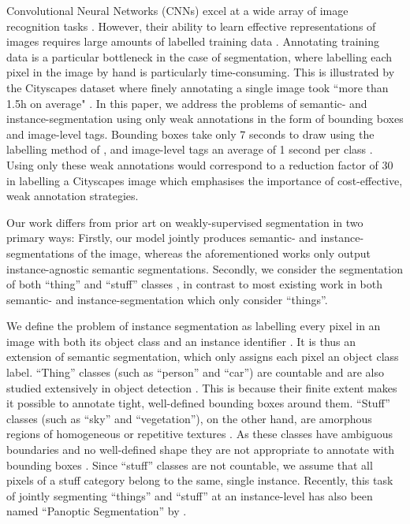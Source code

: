 \documentclass[runningheads]{llncs}
\begin{document}
Convolutional Neural Networks (CNNs) excel at a wide array of image recognition tasks \cite{he_cvpr_2016,simonyan_iclr_2015,ren_2015}.
However, their ability to learn effective representations of images requires large amounts of labelled training data \cite{russakovsky_ijcv_2015,sun_iccv_2017}.
Annotating training data is a particular bottleneck in the case of segmentation, where labelling each pixel in the image by hand is particularly time-consuming.
This is illustrated by the Cityscapes dataset where finely annotating a single image took ``more than 1.5h on average" \cite{cordts_cvpr_2016}.
In this paper, we address the problems of semantic- and instance-segmentation using only weak annotations in the form of bounding boxes and image-level tags.
Bounding boxes take only 7 seconds to draw using the labelling method of \cite{papadopoulos_iccv_2017}, and image-level tags an average of 1 second per class \cite{papadopoulos_eccv_2014}.
Using only these weak annotations would correspond to a reduction factor of 30 in labelling a Cityscapes image which emphasises the importance of cost-effective, weak annotation strategies.

Our work differs from prior art on weakly-supervised segmentation \cite{kolesnikov_eccv_2016,wei_cvpr_2017,papandreou_2015,dai_2015,bearman_arxiv_2015} in two primary ways:
Firstly, our model jointly produces semantic- and instance-segmentations of the image, whereas the aforementioned works only output instance-agnostic semantic segmentations.
Secondly, we consider the segmentation of both ``thing'' and ``stuff'' classes \cite{forsyth_1996,adelson_2001}, in contrast to most existing work in both semantic- and instance-segmentation which only consider ``things''.

We define the problem of instance segmentation as labelling every pixel in an image with both its object class and an instance identifier \cite{arnab_cvpr_2017,arnab_bmvc_2016,zhang_iccv_2015}.
It is thus an extension of semantic segmentation, which only assigns each pixel an object class label.
``Thing'' classes (such as ``person'' and ``car'') are countable and are also studied extensively in object detection \cite{everingham_2010,lin_2014}. This is because their finite extent makes it possible to annotate tight, well-defined bounding boxes around them.
``Stuff'' classes (such as ``sky'' and ``vegetation''), on the other hand, are amorphous regions of homogeneous or repetitive textures \cite{forsyth_1996}.
As these classes have ambiguous boundaries and no well-defined shape they are not appropriate to annotate with bounding boxes \cite{lin_di_cvpr_2016}.
Since ``stuff'' classes are not countable, we assume that all pixels of a stuff category belong to the same, single instance.
Recently, this task of jointly segmenting ``things'' and ``stuff'' at an instance-level has also been named ``Panoptic Segmentation'' by \cite{kirillov_arxiv_2018}.
\end{document}
